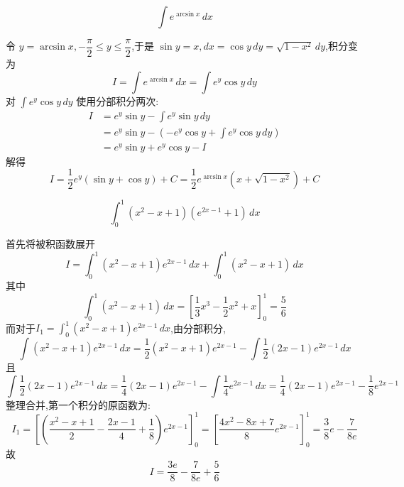 \begin{questions}
    \question 
    \[
    \int e^{\arcsin x} \, dx
    \]
    \begin{solution}
        令 $y = \arcsin x,-\dfrac{\pi}{2} \le y \le \dfrac{\pi}{2}$,于是 $\sin y = x,dx = \cos y \, dy=\sqrt{1-x^2} \,dy$,积分变为
        \[
        I=\int e^{\arcsin x} \, dx = \int e^y \cos y \, dy
        \]
        对 $\int e^y \cos y \, dy$ 使用分部积分两次:
        \begin{align*}
        I&= e^y \sin y - \int e^y \sin y \, dy \\
        &= e^y \sin y - \left(-e^y \cos y + \int e^y \cos y \, dy \right) \\
        &= e^y \sin y + e^y \cos y - I
        \end{align*}
        解得
        \[
        I = \frac{1}{2} e^y (\sin y + \cos y) + C = \frac{1}{2} e^{\arcsin x} (x + \sqrt{1-x^2}) + C
        \]
    \end{solution}

    \question 
    \[
    \int_0^1 (x^2 - x + 1)(e^{2x-1} + 1) \, dx
    \]
    \begin{solution}
        首先将被积函数展开
        \[
        I=\int_0^1 (x^2 - x + 1)e^{2x-1} \, dx + \int_0^1 (x^2 - x + 1) \, dx
        \]
        其中
        \[
        \int_0^1 (x^2 - x + 1) \, dx = \left[ \frac{1}{3}x^3 - \frac{1}{2}x^2 + x \right]_0^1 = \frac{5}{6}
        \]
        而对于$I_1=\displaystyle \int_0^1 (x^2 - x + 1)e^{2x-1} \, dx$,由分部积分,
        \[
        \int (x^2 - x + 1)e^{2x-1} \, dx = \frac{1}{2}(x^2 - x + 1)e^{2x-1} - \int \frac{1}{2}(2x - 1)e^{2x-1} \, dx
        \]
        且
        \[
        \int \frac{1}{2}(2x - 1)e^{2x-1} \, dx = \frac{1}{4}(2x - 1)e^{2x-1} - \int \frac{1}{4}e^{2x-1} \, dx = \frac{1}{4}(2x - 1)e^{2x-1} - \frac{1}{8}e^{2x-1}
        \]
        整理合并,第一个积分的原函数为:
        \[
        I_1=\left[\left( \frac{x^2 - x + 1}{2} - \frac{2x - 1}{4} + \frac{1}{8} \right) e^{2x-1}\right]_0^1 = \left[\frac{4x^2 - 8x + 7}{8} e^{2x-1}\right]_0^1 = \frac{3}{8}e - \frac{7}{8e}
        \]
        故
        \[
        I= \frac{3e}{8} - \frac{7}{8e} + \frac{5}{6}
        \]
    \end{solution}


\end{questions}
